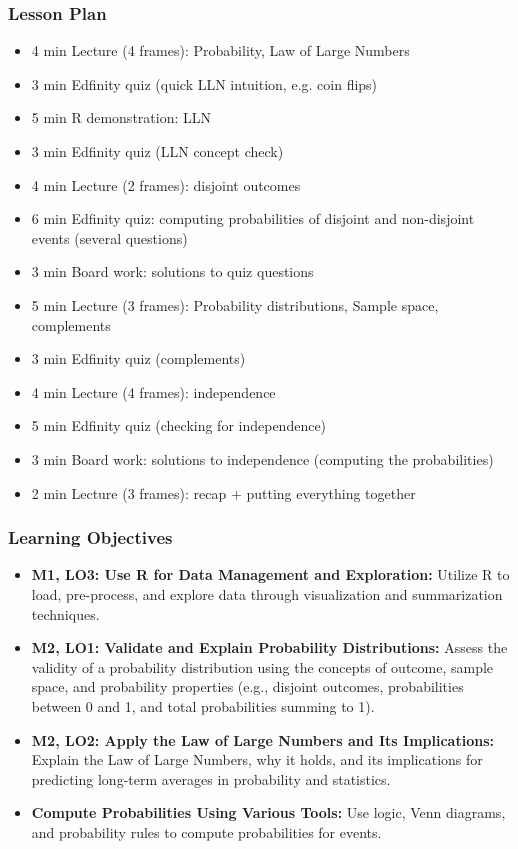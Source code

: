 \begin{frame}
    \frametitle{Lesson Plan}
    \begin{itemize}
        \item 4 min Lecture (4 frames): Probability, Law of Large Numbers
        \item 3 min Edfinity quiz (quick LLN intuition, e.g. coin flips)
        \item 5 min R demonstration: LLN
        \item 3 min Edfinity quiz (LLN concept check)
        \item 4 min Lecture (2 frames): disjoint outcomes
        \item 6 min Edfinity quiz: computing probabilities of disjoint and non-disjoint events (several questions)
        \item 3 min Board work: solutions to quiz questions
        \item 5 min Lecture (3 frames): Probability distributions, Sample space, complements
        \item 3 min Edfinity quiz (complements)
        \item 4 min Lecture (4 frames): independence
        \item 5 min Edfinity quiz (checking for independence)
        \item 3 min Board work: solutions to independence (computing the probabilities)
        \item 2 min Lecture (3 frames): recap + putting everything together
    \end{itemize}
\end{frame}

\begin{frame}
    \frametitle{Learning Objectives}
    \begin{itemize}
        \item \textbf{M1, LO3: Use R for Data Management and Exploration:} Utilize R to load, pre-process, and explore data through visualization and summarization techniques.
        \item \textbf{M2, LO1: Validate and Explain Probability Distributions:} Assess the validity of a probability distribution using the concepts of outcome, sample space, and probability properties (e.g., disjoint outcomes, probabilities between 0 and 1, and total probabilities summing to 1).
        \item \textbf{M2, LO2: Apply the Law of Large Numbers and Its Implications:} Explain the Law of Large Numbers, why it holds, and its implications for predicting long-term averages in probability and statistics.
        \item \textbf{Compute Probabilities Using Various Tools:} Use logic, Venn diagrams, and probability rules to compute probabilities for events.
    \end{itemize}
\end{frame}

